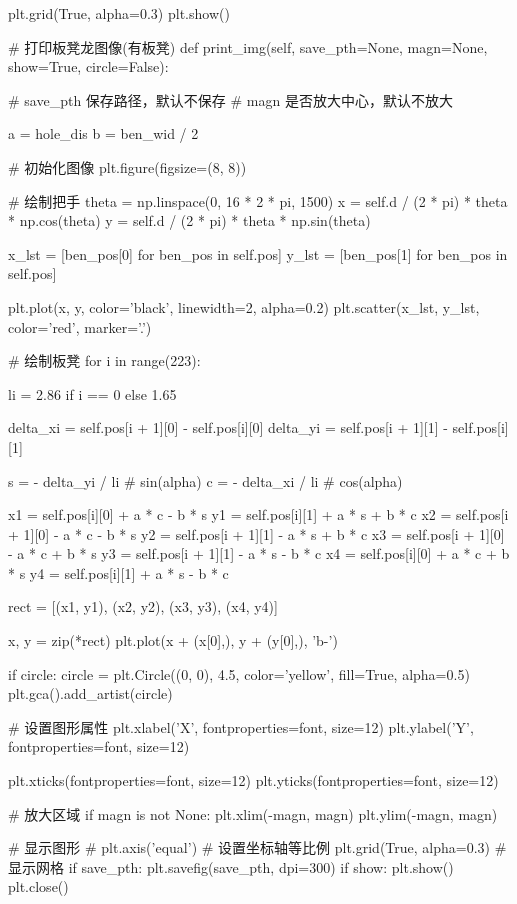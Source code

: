 \documentclass[withoutpreface,bwprint]{cumcmthesis}
\begin{document}
\begin{CodeText}
   plt.grid(True, alpha=0.3)
   plt.show()

# 打印板凳龙图像(有板凳)
def print_img(self, save_pth=None, magn=None, show=True, circle=False):

   # save_pth 保存路径，默认不保存
   # magn 是否放大中心，默认不放大

   a = hole_dis
   b = ben_wid / 2

   # 初始化图像
   plt.figure(figsize=(8, 8))


# 绘制把手
theta = np.linspace(0, 16 * 2 * pi, 1500)
x = self.d / (2 * pi) * theta * np.cos(theta)
y = self.d / (2 * pi) * theta * np.sin(theta)

x_lst = [ben_pos[0] for ben_pos in self.pos]
y_lst = [ben_pos[1] for ben_pos in self.pos]

plt.plot(x, y, color='black', linewidth=2, alpha=0.2)
plt.scatter(x_lst, y_lst, color='red', marker='.')

# 绘制板凳
for i in range(223):

   li = 2.86 if i == 0 else 1.65

   delta_xi = self.pos[i + 1][0] - self.pos[i][0]
   delta_yi = self.pos[i + 1][1] - self.pos[i][1]

   s = - delta_yi / li # sin(alpha)
   c = - delta_xi / li # cos(alpha)

   x1 = self.pos[i][0] + a * c - b * s
   y1 = self.pos[i][1] + a * s + b * c
   x2 = self.pos[i + 1][0] - a * c - b * s
   y2 = self.pos[i + 1][1] - a * s + b * c
   x3 = self.pos[i + 1][0] - a * c + b * s
   y3 = self.pos[i + 1][1] - a * s - b * c
   x4 = self.pos[i][0] + a * c + b * s
   y4 = self.pos[i][1] + a * s - b * c

   rect = [(x1, y1), (x2, y2), (x3, y3), (x4, y4)]

   x, y = zip(*rect)
   plt.plot(x + (x[0],), y + (y[0],), 'b-')

if circle:
   circle = plt.Circle((0, 0), 4.5, color='yellow', fill=True, alpha=0.5)
   plt.gca().add_artist(circle)

# 设置图形属性
plt.xlabel('X', fontproperties=font, size=12)
plt.ylabel('Y', fontproperties=font, size=12)

plt.xticks(fontproperties=font, size=12)
plt.yticks(fontproperties=font, size=12)


   # 放大区域
   if magn is not None:
      plt.xlim(-magn, magn)
      plt.ylim(-magn, magn)

   # 显示图形
   # plt.axis('equal') # 设置坐标轴等比例
   plt.grid(True, alpha=0.3) # 显示网格
   if save_pth:
      plt.savefig(save_pth, dpi=300)
   if show:
      plt.show()
   plt.close()


\end{CodeText}
\end{document}
